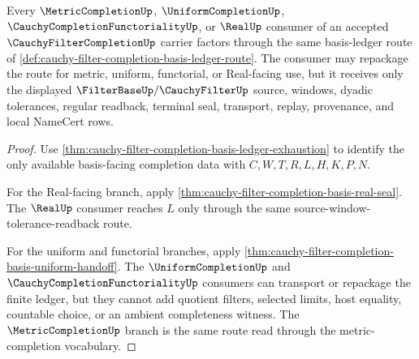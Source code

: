 \begin{theorem}
\label{thm:cauchy-filter-completion-basis-universal-consumer-route}
Every $\MetricCompletionUp$, $\UniformCompletionUp$, $\CauchyCompletionFunctorialityUp$, or $\RealUp$ consumer of an accepted $\CauchyFilterCompletionUp$ carrier factors through the same basis-ledger route of \autoref{def:cauchy-filter-completion-basis-ledger-route}. The consumer may repackage the route for metric, uniform, functorial, or Real-facing use, but it receives only the displayed $\FilterBaseUp/\CauchyFilterUp$ source, windows, dyadic tolerances, regular readback, terminal seal, transport, replay, provenance, and local NameCert rows.
\end{theorem}
\begin{proof}
Use \autoref{thm:cauchy-filter-completion-basis-ledger-exhaustion} to identify the only available basis-facing completion data with $C,W,T,R,L,H,K,P,N$.

For the Real-facing branch, apply \autoref{thm:cauchy-filter-completion-basis-real-seal}. The $\RealUp$ consumer reaches $L$ only through the same source-window-tolerance-readback route.

For the uniform and functorial branches, apply \autoref{thm:cauchy-filter-completion-basis-uniform-handoff}. The $\UniformCompletionUp$ and $\CauchyCompletionFunctorialityUp$ consumers can transport or repackage the finite ledger, but they cannot add quotient filters, selected limits, host equality, countable choice, or an ambient completeness witness. The $\MetricCompletionUp$ branch is the same route read through the metric-completion vocabulary.
\end{proof}

